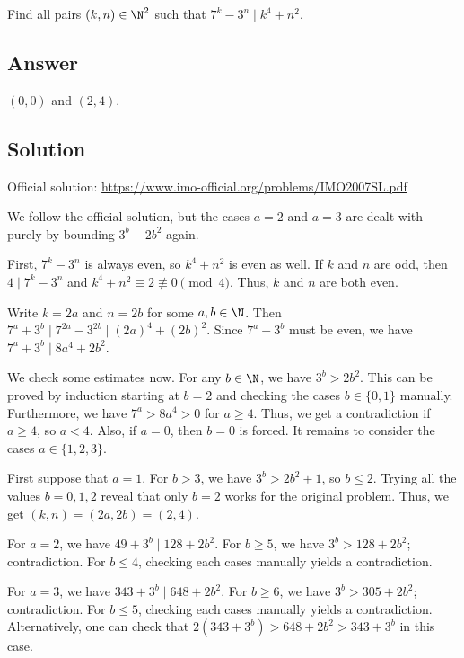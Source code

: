 Find all pairs $(k, n) \in \N^2$ such that $7^k - 3^n \mid k^4 + n^2$.



\subsection*{Answer}

$(0, 0)$ and $(2, 4)$.



\subsection*{Solution}

Official solution: \url{https://www.imo-official.org/problems/IMO2007SL.pdf}

We follow the official solution, but the cases $a = 2$ and $a = 3$ are dealt with purely by bounding $3^b - 2b^2$ again.

First, $7^k - 3^n$ is always even, so $k^4 + n^2$ is even as well.
If $k$ and $n$ are odd, then $4 \mid 7^k - 3^n$ and $k^4 + n^2 \equiv 2 \not\equiv 0 \pmod{4}$.
Thus, $k$ and $n$ are both even.

Write $k = 2a$ and $n = 2b$ for some $a, b \in \N$.
Then $7^a + 3^b \mid 7^{2a} - 3^{2b} \mid (2a)^4 + (2b)^2$.
Since $7^a - 3^b$ must be even, we have $7^a + 3^b \mid 8a^4 + 2b^2$.

We check some estimates now.
For any $b \in \N$, we have $3^b > 2b^2$.
This can be proved by induction starting at $b = 2$ and checking the cases $b \in \{0, 1\}$ manually.
Furthermore, we have $7^a > 8a^4 > 0$ for $a \geq 4$.
Thus, we get a contradiction if $a \geq 4$, so $a < 4$.
Also, if $a = 0$, then $b = 0$ is forced.
It remains to consider the cases $a \in \{1, 2, 3\}$.

First suppose that $a = 1$.
For $b > 3$, we have $3^b > 2b^2 + 1$, so $b \leq 2$.
Trying all the values $b = 0, 1, 2$ reveal that only $b = 2$ works for the original problem.
Thus, we get $(k, n) = (2a, 2b) = (2, 4)$.

For $a = 2$, we have $49 + 3^b \mid 128 + 2b^2$.
For $b \geq 5$, we have $3^b > 128 + 2b^2$; contradiction.
For $b \leq 4$, checking each cases manually yields a contradiction.

For $a = 3$, we have $343 + 3^b \mid 648 + 2b^2$.
For $b \geq 6$, we have $3^b > 305 + 2b^2$; contradiction.
For $b \leq 5$, checking each cases manually yields a contradiction.
Alternatively, one can check that $2(343 + 3^b) > 648 + 2b^2 > 343 + 3^b$ in this case.
